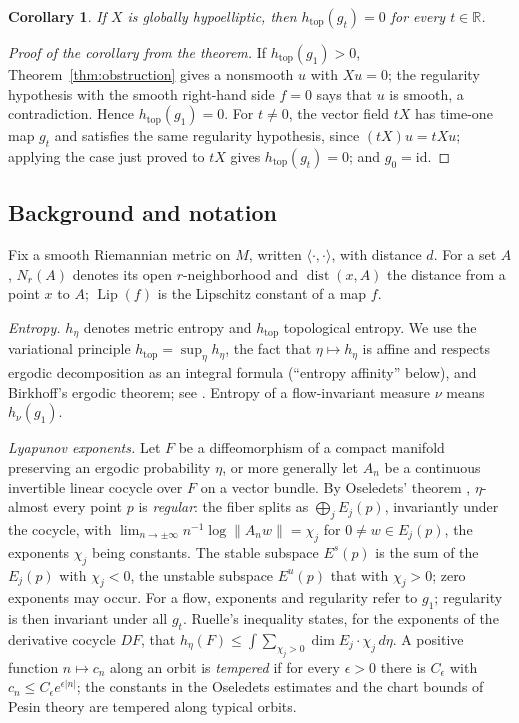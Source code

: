 \documentclass[11pt]{article}
\newtheorem{corollary}[theorem]{Corollary}
\theoremstyle{remark}
\newcommand{\R}{\mathbb R}
\newcommand{\htop}{h_{\mathrm{top}}}
\newcommand{\dist}{\operatorname{dist}}
\newcommand{\Lip}{\operatorname{Lip}}
\begin{document}
\begin{corollary}\label{cor:answer}
If \(X\) is globally hypoelliptic, then \(\htop(g_t)=0\) for every
\(t\in\R\).
\end{corollary}

\begin{proof}[Proof of the corollary from the theorem]
If \(\htop(g_1)>0\), Theorem~\ref{thm:obstruction} gives a nonsmooth
\(u\) with \(Xu=0\); the regularity hypothesis with the smooth
right-hand side \(f=0\) says that \(u\) is smooth, a contradiction.
Hence \(\htop(g_1)=0\).
For \(t\ne0\), the vector field \(tX\) has time-one map \(g_t\) and
satisfies the same regularity hypothesis, since \((tX)u=tXu\); applying
the case just proved to \(tX\) gives \(\htop(g_t)=0\); and
\(g_0=\mathrm{id}\).
\end{proof}

\subsection{Background and notation}
\label{sec:background}

Fix a smooth Riemannian metric on \(M\), written
\(\langle\cdot,\cdot\rangle\), with distance \(d\).  For a set
\(A\), \(N_r(A)\) denotes its open \(r\)-neighborhood and
\(\dist(x,A)\) the distance from a point \(x\) to \(A\);
\(\Lip(f)\) is the Lipschitz constant of a map \(f\).

\emph{Entropy.}  \(h_\eta\) denotes metric entropy and \(\htop\)
topological entropy.  We use the variational principle
\(\htop=\sup_\eta h_\eta\), the fact that \(\eta\mapsto h_\eta\) is
affine and respects ergodic decomposition as an integral formula
(``entropy affinity'' below),
and Birkhoff's ergodic theorem; see \cite{Walters1982}.  Entropy of a
flow-invariant measure \(\nu\) means \(h_\nu(g_1)\).

\emph{Lyapunov exponents.}  Let \(F\) be a diffeomorphism of a
compact manifold preserving an ergodic probability \(\eta\),
or more generally let \(A_n\) be a continuous invertible linear
cocycle over \(F\) on a vector bundle.  By Oseledets' theorem
\cite{Oseledets1968}, \(\eta\)-almost every point
\(p\) is \emph{regular}: the fiber splits as
\(\bigoplus_jE_j(p)\), invariantly under the cocycle, with
\(\lim_{n\to\pm\infty}n^{-1}\log\|A_nw\|=\chi_j\) for
\(0\ne w\in E_j(p)\), the exponents \(\chi_j\) being constants.
The stable subspace \(E^s(p)\) is the sum of the \(E_j(p)\) with
\(\chi_j<0\), the unstable subspace \(E^u(p)\) that with
\(\chi_j>0\); zero exponents may occur.  For a flow, exponents and
regularity refer to \(g_1\); regularity is then
invariant under all \(g_t\).  Ruelle's inequality
\cite{Ruelle1978} states, for the exponents of the derivative
cocycle \(DF\), that
\(h_\eta(F)\le\int\sum_{\chi_j>0}\dim E_j\cdot\chi_j\,d\eta\).
A positive function \(n\mapsto c_n\) along an orbit is
\emph{tempered} if for every \(\epsilon>0\) there is
\(C_\epsilon\) with \(c_n\le C_\epsilon e^{\epsilon|n|}\); the
constants in the Oseledets estimates and the chart bounds of Pesin
theory are tempered along typical orbits.
\end{document}
